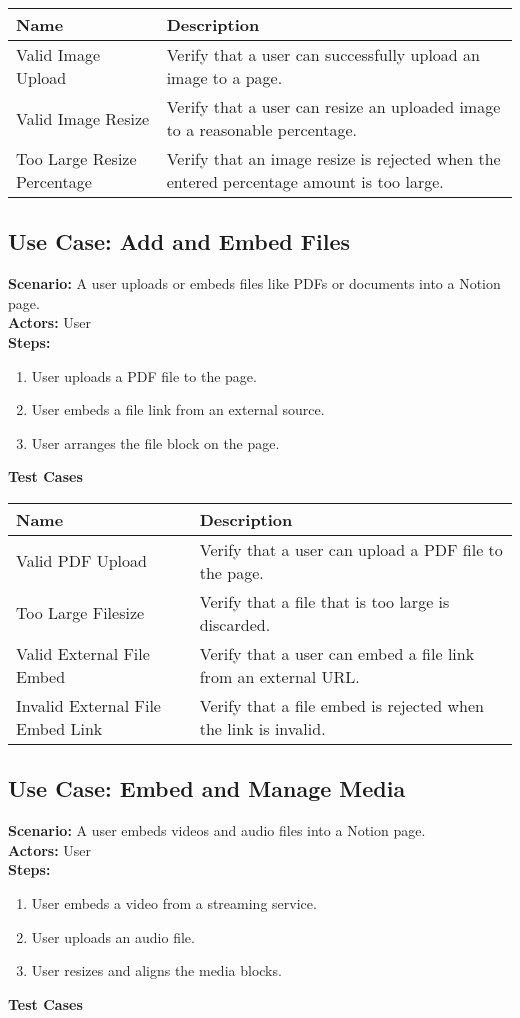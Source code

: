\documentclass{article}
\begin{document}
            \begin{longtable}{|p{}|p{}|}
            \hline
            \textbf{Name} & \textbf{Description} \\
            \hline
            Valid Image Upload & Verify that a user can successfully upload an image to a page. \\
\hline
Valid Image Resize & Verify that a user can resize an uploaded image to a reasonable percentage. \\
\hline
Too Large Resize Percentage & Verify that an image resize is rejected when the entered percentage amount is too large. \\
\hline
\end{longtable}\subsection{\textbf{Use Case: Add and Embed Files}}
\textbf{Scenario:} A user uploads or embeds files like PDFs or documents into a Notion page.\\
\textbf{Actors:} User\\
\textbf{Steps:}
\begin{enumerate}
\item User uploads a PDF file to the page.
\item User embeds a file link from an external source.
\item User arranges the file block on the page.
\end{enumerate}
\textbf{Test Cases}

            \begin{longtable}{|p{}|p{}|}
            \hline
            \textbf{Name} & \textbf{Description} \\
            \hline
            Valid PDF Upload & Verify that a user can upload a PDF file to the page. \\
\hline
Too Large Filesize & Verify that a file that is too large is discarded. \\
\hline
Valid External File Embed & Verify that a user can embed a file link from an external URL. \\
\hline
Invalid External File Embed Link & Verify that a file embed is rejected when the link is invalid. \\
\hline
\end{longtable}\subsection{\textbf{Use Case: Embed and Manage Media}}
\textbf{Scenario:} A user embeds videos and audio files into a Notion page.\\
\textbf{Actors:} User\\
\textbf{Steps:}
\begin{enumerate}
\item User embeds a video from a streaming service.
\item User uploads an audio file.
\item User resizes and aligns the media blocks.
\end{enumerate}
\textbf{Test Cases}
\end{document}
